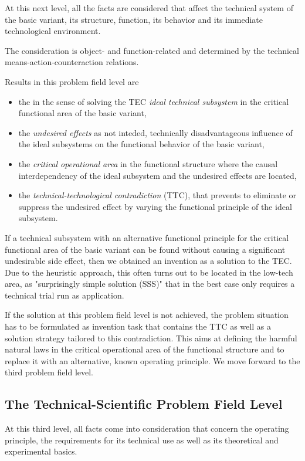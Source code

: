 \documentclass[11pt,a4paper]{article}
\begin{document}
At this next level, all the facts are considered that affect the technical
system of the basic variant, its structure, function, its behavior and its
immediate technological environment.

The consideration is object- and function-related and determined by the
technical means-action-counteraction relations.

Results in this problem field level are
\begin{itemize}
\item the in the sense of solving the TEC \emph{ideal technical subsystem} in
  the critical functional area of the basic variant,
\item the \emph{undesired effects} as not inteded, technically disadvantageous
  influence of the ideal subsystems on the functional behavior of the basic
  variant,
\item the \emph{critical operational area} in the functional structure where
  the causal interdependency of the ideal subsystem and the undesired effects
  are located,
\item the \emph{technical-technological contradiction} (TTC), that prevents to
  eliminate or suppress the undesired effect by varying the functional
  principle of the ideal subsystem.
\end{itemize}
If a technical subsystem with an alternative functional principle for the
critical functional area of the basic variant can be found without causing a
significant undesirable side effect, then we obtained an invention as a
solution to the TEC. Due to the heuristic approach, this often turns out to be
located in the low-tech area, as "surprisingly simple solution (SSS)" that in
the best case only requires a technical trial run as application.

If the solution at this problem field level is not achieved, the problem
situation has to be formulated as invention task that contains the TTC as well
as a solution strategy tailored to this contradiction. This aims at defining
the harmful natural laws in the critical operational area of the functional
structure and to replace it with an alternative, known operating principle.
We move forward to the third problem field level.

\subsection{The Technical-Scientific Problem Field Level}

At this third level, all facts come into consideration that concern the
operating principle, the requirements for its technical use as well as its
theoretical and experimental basics.
\end{document}
